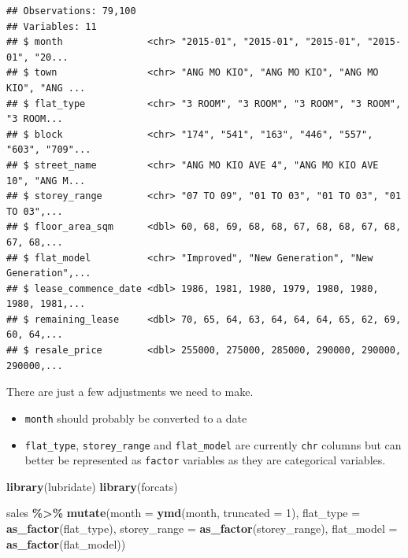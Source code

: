 \documentclass[]{book}
\newenvironment{Shaded}{\begin{snugshade}}{\end{snugshade}}
\newcommand{\DataTypeTok}[1]{\textcolor[rgb]{0.13,0.29,0.53}{#1}}
\newcommand{\DecValTok}[1]{\textcolor[rgb]{0.00,0.00,0.81}{#1}}
\newcommand{\KeywordTok}[1]{\textcolor[rgb]{0.13,0.29,0.53}{\textbf{#1}}}
\newcommand{\NormalTok}[1]{#1}
\newcommand{\OperatorTok}[1]{\textcolor[rgb]{0.81,0.36,0.00}{\textbf{#1}}}
\newcommand{\StringTok}[1]{\textcolor[rgb]{0.31,0.60,0.02}{#1}}
\providecommand{\tightlist}{%
  \setlength{\itemsep}{0pt}\setlength{\parskip}{0pt}}
\begin{document}
\begin{verbatim}
## Observations: 79,100
## Variables: 11
## $ month               <chr> "2015-01", "2015-01", "2015-01", "2015-01", "20...
## $ town                <chr> "ANG MO KIO", "ANG MO KIO", "ANG MO KIO", "ANG ...
## $ flat_type           <chr> "3 ROOM", "3 ROOM", "3 ROOM", "3 ROOM", "3 ROOM...
## $ block               <chr> "174", "541", "163", "446", "557", "603", "709"...
## $ street_name         <chr> "ANG MO KIO AVE 4", "ANG MO KIO AVE 10", "ANG M...
## $ storey_range        <chr> "07 TO 09", "01 TO 03", "01 TO 03", "01 TO 03",...
## $ floor_area_sqm      <dbl> 60, 68, 69, 68, 68, 67, 68, 68, 67, 68, 67, 68,...
## $ flat_model          <chr> "Improved", "New Generation", "New Generation",...
## $ lease_commence_date <dbl> 1986, 1981, 1980, 1979, 1980, 1980, 1980, 1981,...
## $ remaining_lease     <dbl> 70, 65, 64, 63, 64, 64, 64, 65, 62, 69, 60, 64,...
## $ resale_price        <dbl> 255000, 275000, 285000, 290000, 290000, 290000,...
\end{verbatim}

There are just a few adjustments we need to make.

\begin{itemize}
\tightlist
\item
  \texttt{month} should probably be converted to a date
\item
  \texttt{flat\_type}, \texttt{storey\_range} and \texttt{flat\_model} are currently \texttt{chr} columns but can better be represented as \texttt{factor} variables as they are categorical variables.
\end{itemize}

\begin{Shaded}
\begin{Highlighting}[]
\KeywordTok{library}\NormalTok{(lubridate)}
\KeywordTok{library}\NormalTok{(forcats)}

\NormalTok{sales }\OperatorTok{\%>\%}\StringTok{ }
\StringTok{  }\KeywordTok{mutate}\NormalTok{(}\DataTypeTok{month =} \KeywordTok{ymd}\NormalTok{(month, }\DataTypeTok{truncated =} \DecValTok{1}\NormalTok{),}
         \DataTypeTok{flat\_type =} \KeywordTok{as\_factor}\NormalTok{(flat\_type),}
         \DataTypeTok{storey\_range =} \KeywordTok{as\_factor}\NormalTok{(storey\_range),}
         \DataTypeTok{flat\_model =} \KeywordTok{as\_factor}\NormalTok{(flat\_model))}
\end{Highlighting}
\end{Shaded}
\end{document}
